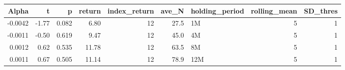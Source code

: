 \begin{table}[ht]
\centering
\begin{tabular}{rrrrrrlrr}
  \hline
Alpha & t & p & return & index\_return & ave\_N & holding\_period & rolling\_mean & SD\_thres \\ 
  \hline
-0.0042 & -1.77 & 0.082 & 6.80 & 12 & 27.5 & 1M &  5 &  1 \\ 
  -0.0011 & -0.50 & 0.619 & 9.47 & 12 & 45.0 & 4M &  5 &  1 \\ 
  0.0012 & 0.62 & 0.535 & 11.78 & 12 & 63.5 & 8M &  5 &  1 \\ 
  0.0011 & 0.67 & 0.505 & 11.14 & 12 & 78.9 & 12M &  5 &  1 \\ 
   \hline
\end{tabular}
\end{table}

